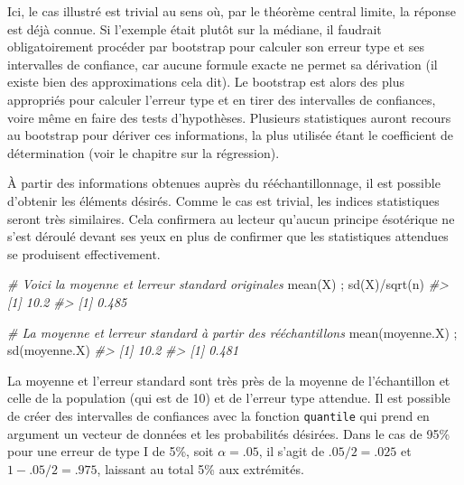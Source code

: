 \documentclass[
]{book}
\newenvironment{Shaded}{}{}
\newcommand{\CommentTok}[1]{\textit{#1}}
\newcommand{\FunctionTok}[1]{#1}
\newcommand{\NormalTok}[1]{#1}
\newcommand{\SpecialCharTok}[1]{#1}
\begin{document}
Ici, le cas illustré est trivial au sens où, par le théorème central limite, la réponse est déjà connue. Si l'exemple était plutôt sur la médiane, il faudrait obligatoirement procéder par bootstrap pour calculer son erreur type et ses intervalles de confiance, car aucune formule exacte ne permet sa dérivation (il existe bien des approximations cela dit). Le bootstrap est alors des plus appropriés pour calculer l'erreur type et en tirer des intervalles de confiances, voire même en faire des tests d'hypothèses. Plusieurs statistiques auront recours au bootstrap pour dériver ces informations, la plus utilisée étant le coefficient de détermination (voir le chapitre sur la régression).

À partir des informations obtenues auprès du rééchantillonnage, il est possible d'obtenir les éléments désirés. Comme le cas est trivial, les indices statistiques seront très similaires. Cela confirmera au lecteur qu'aucun principe ésotérique ne s'est déroulé devant ses yeux en plus de confirmer que les statistiques attendues se produisent effectivement.

\begin{Shaded}
\begin{Highlighting}[]
\CommentTok{\# Voici la moyenne et l\textquotesingle{}erreur standard originales}
\FunctionTok{mean}\NormalTok{(X) ; }\FunctionTok{sd}\NormalTok{(X)}\SpecialCharTok{/}\FunctionTok{sqrt}\NormalTok{(n)}
\CommentTok{\#\textgreater{} [1] 10.2}
\CommentTok{\#\textgreater{} [1] 0.485}

\CommentTok{\# La moyenne et l\textquotesingle{}erreur standard à partir des rééchantillons}
\FunctionTok{mean}\NormalTok{(moyenne.X)  ; }\FunctionTok{sd}\NormalTok{(moyenne.X)}
\CommentTok{\#\textgreater{} [1] 10.2}
\CommentTok{\#\textgreater{} [1] 0.481}
\end{Highlighting}
\end{Shaded}

La moyenne et l'erreur standard sont très près de la moyenne de l'échantillon et celle de la population (qui est de 10) et de l'erreur type attendue. Il est possible de créer des intervalles de confiances avec la fonction \texttt{quantile} qui prend en argument un vecteur de données et les probabilités désirées. Dans le cas de 95\% pour une erreur de type I de 5\%, soit \(\alpha=.05\), il s'agit de \(.05/2 = .025\) et \(1-.05/2= .975\), laissant au total 5\% aux extrémités.
\end{document}
